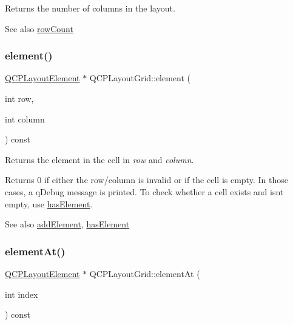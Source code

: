 Returns the number of columns in the layout.

\begin{DoxySeeAlso}{See also}
\hyperlink{classQCPLayoutGrid_a19c66fd76cbce58a8e94f33797e0c0aa}{row\+Count} 
\end{DoxySeeAlso}
\mbox{\label{classQCPLayoutGrid_a602b426609b4411cf6a93c3ddf3a381a}} 
\subsubsection{\texorpdfstring{element()}{element()}}
{\footnotesize\ttfamily \hyperlink{classQCPLayoutElement}{Q\+C\+P\+Layout\+Element} $\ast$ Q\+C\+P\+Layout\+Grid\+::element (\begin{DoxyParamCaption}\item[{int}]{row,  }\item[{int}]{column }\end{DoxyParamCaption}) const}

Returns the element in the cell in {\itshape row} and {\itshape column}.

Returns 0 if either the row/column is invalid or if the cell is empty. In those cases, a q\+Debug message is printed. To check whether a cell exists and isn\textquotesingle{}t empty, use \hyperlink{classQCPLayoutGrid_ab0cf4f7edc9414a3bfaddac0f46dc0a0}{has\+Element}.

\begin{DoxySeeAlso}{See also}
\hyperlink{classQCPLayoutGrid_adff1a2ca691ed83d2d24a4cd1fe17012}{add\+Element}, \hyperlink{classQCPLayoutGrid_ab0cf4f7edc9414a3bfaddac0f46dc0a0}{has\+Element} 
\end{DoxySeeAlso}
\mbox{\label{classQCPLayoutGrid_a4288f174082555f6bd92021bdedb75dc}} 
\subsubsection{\texorpdfstring{element\+At()}{elementAt()}}
{\footnotesize\ttfamily \hyperlink{classQCPLayoutElement}{Q\+C\+P\+Layout\+Element} $\ast$ Q\+C\+P\+Layout\+Grid\+::element\+At (\begin{DoxyParamCaption}\item[{int}]{index }\end{DoxyParamCaption}) const\hspace{0.3cm}{\ttfamily [virtual]}}

